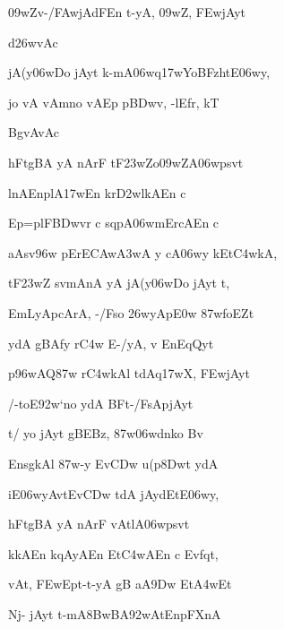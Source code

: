 {\dn {}\309wZv-/\3FAwjAdFEn t-yA, \309wZ, \3FEwjAyt\? \vegdn\dontdisplaylinenum}

{\dn d\?\326wvAc{\dandabdn}\dontdisplaylinenum }

{\dn jA(y\306wDo jAyt\? k-mA\306wq\317wYoBFzh\0t\?E\306wy,{\dandadn} \dontdisplaylinenum}

{\dn {}jo vA vAmno vAEp p\3BDwv, -lEfr, kT \vegdn\dontdisplaylinenum}

{\dn BgvAvAc{\dandabdn}\dontdisplaylinenum }

{\dn {}hFtgBA\0 yA nArF tF\323wZo\309wZA\306wps\?vt\?{\dandadn} \dontdisplaylinenum}

{\dn lnAEnplA\317wEn kr\3D2wlkAEn c \vegdn\dontdisplaylinenum}

{\dn Ep=plF\3BDwv\?r\2 c sq\0pA\306wmErcAEn c{\dandabdn} \dontdisplaylinenum}

{\dn aAsv\396w pErE\3CAw\3A3wA y\? cA\306wy\? kEt\3C4wkA, \vegdn\dontdisplaylinenum}

{\dn tF\323wZ\2  s\?vmAnA yA jA(y\306wDo jAyt\? t,{\dandabdn} \dontdisplaylinenum}

{\dn EmLyApcArA, -/F\2so \326wyAp\3E0w\? \387wfoEZt\?{\dandadn}\dontdisplaylinenum }

{\dn ydA gBA\0fy\? r\3C4w\2 E-/yA, v{\rdt} EnEqQyt\? \vegdn\dontdisplaylinenum}

{\dn p\396wAQ\387w\2 r\3C4wkAl\? tdAq\317wX, \3FEwjAyt\?{\dandabdn} \dontdisplaylinenum}

{\dn /-toE\392w`no ydA BFt-/F\2sA\2pjAyt\? \vegdn\dontdisplaylinenum}

{\dn t/ yo jAyt\? gB\0EBz, \387w\306wdnko Bv\? \dontdisplaylinenum}

{\dn Ensg\0kAl\? \387w-y Ev\3CDw u(p\38Dwt\? ydA \vegdn\dontdisplaylinenum}

{\dn iE\306wyAvt\0Ev\3CDw\?  tdA jAy\?dEtE\306wy,{\dandabdn} \dontdisplaylinenum }

{\dn {}hFtgBA\0 yA nArF vAtlA\306wps\?vt\? \vegdn\dontdisplaylinenum}

{\dn kkAEn kqAyAEn Et\3C4wAEn c Evf\?qt,{\dandabdn} \dontdisplaylinenum}

{\dn vAt, \3FEwEpt-t-yA gB\0 aA\39Dw Et\3A4wEt \vegdn\dontdisplaylinenum}

{\dn {}Nj- jAyt\? t-mA\38BwBA\0\392wAtEnpFXnA \dontdisplaylinenum}

